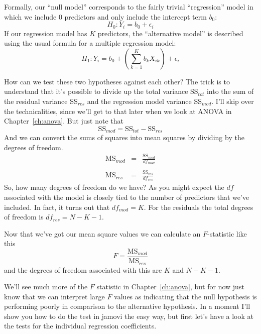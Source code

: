 \vspace{0.5cm}
\begin{mdframed}[style=MyFrame,nobreak=false]
Formally, our ``null model'' corresponds to the fairly trivial ``regression'' model in which we include 0 predictors and only include the intercept term $b_0$:
$$
H_0: Y_i = b_0 + \epsilon_i
$$
If our regression model has $K$ predictors, the ``alternative model'' is described using the usual formula for a multiple regression model:
$$
H_1: Y_i = b_0 + \left( \sum_{k=1}^K b_{k} X_{ik} \right) + \epsilon_i
$$

How can we test these two hypotheses against each other? The trick is to understand that it's possible to divide up the total variance $\mbox{SS}_{tot}$ into the sum of the residual variance $\mbox{SS}_{res}$ and the regression model variance $\mbox{SS}_{mod}$. I'll skip over the technicalities, since we'll get to that later when we look at ANOVA in Chapter~\ref{ch:anova}. But just note that
$$
\mbox{SS}_{mod} = \mbox{SS}_{tot} - \mbox{SS}_{res}
$$
And we can convert the sums of squares into mean squares by dividing by the degrees of freedom. 
$$\begin{array}{rcl}
\mbox{MS}_{mod} &=& \displaystyle\frac{\mbox{SS}_{mod} }{df_{mod}} \\ \\
\mbox{MS}_{res} &=& \displaystyle\frac{\mbox{SS}_{res} }{df_{res}} 
\end{array}
$$ 
So, how many degrees of freedom do we have? As you might expect the $df$ associated with the model is closely tied to the number of predictors that we've included. In fact, it turns out that $df_{mod} = K$. For the residuals the total degrees of freedom is $df_{res} = N -K - 1$. 

Now that we've got our mean square values we can calculate an $F$-statistic like this
$$
F =  \frac{\mbox{MS}_{mod}}{\mbox{MS}_{res}}
$$
and the degrees of freedom associated with this are $K$ and $N-K-1$. 
\end{mdframed}

We'll see much more of the $F$ statistic in Chapter~\ref{ch:anova}, but for now just know that we can interpret large $F$ values as indicating that the null hypothesis is performing poorly in comparison to the alternative hypothesis. In a moment I'll show you how to do the test in jamovi the easy way, but first let's have a look at the tests for the individual regression coefficients.


